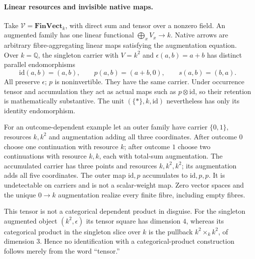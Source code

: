 \documentclass[11pt,a4paper]{article}
\theoremstyle{definition}
\newcommand{\V}{\mathcal V}
\newcommand{\id}{\mathrm{id}}
\newcommand{\FinVect}{\mathbf{FinVect}}
\begin{document}
\paragraph{Linear resources and invisible native maps.}
Take $\V=\FinVect_k$, with direct sum and tensor over a nonzero field.
An augmented family has one linear functional $\bigoplus_xV_x\to k$.
Native arrows are arbitrary fibre-aggregating linear maps satisfying the
augmentation equation. Over $k=\mathbb Q$, the singleton carrier with
$V=k^2$ and $\epsilon(a,b)=a+b$ has distinct parallel endomorphisms
\[
 \id(a,b)=(a,b),\qquad p(a,b)=(a+b,0),\qquad s(a,b)=(b,a).
\]
All preserve $\epsilon$; $p$ is noninvertible. They have the same carrier.
Under occurrence tensor and accumulation they act as actual maps such as
$p\otimes\id$, so their retention is mathematically substantive.
The unit $(\{*\},k,\id)$ nevertheless has only its identity endomorphism.

For an outcome-dependent example let an outer family have carrier $\{0,1\}$,
resources $k,k^2$ and augmentation adding all three coordinates. After outcome
$0$ choose one continuation with resource $k$; after outcome $1$ choose two
continuations with resource $k,k$, each with total-sum augmentation. The
accumulated carrier has three points and resources $k,k^2,k^2$; its
augmentation adds all five coordinates. The outer map $\id,p$ accumulates to
$\id,p,p$. It is undetectable on carriers and is not a scalar-weight map.
Zero vector spaces and the unique $0\to k$ augmentation realize every finite
fibre, including empty fibres.

This tensor is not a categorical dependent product in disguise. For the
singleton augmented object $(k^2,\epsilon)$ its tensor square has dimension
$4$, whereas its categorical product in the singleton slice over $k$ is the
pullback $k^2\times_k k^2$, of dimension $3$. Hence no identification with a
categorical-product construction follows merely from the word ``tensor.''
\end{document}
